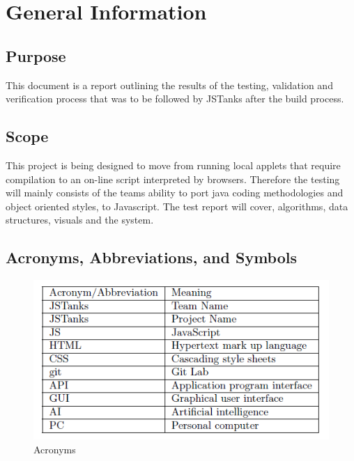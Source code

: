 \documentclass{article}
\begin{document}
\section{General Information}
\subsection{Purpose}
This document is a report outlining the results of the testing, validation and verification process 
that was to be followed by JSTanks after the build process. 

\subsection{Scope}
This project is being designed to move from running local applets that require 
compilation to an on-line script interpreted by browsers. Therefore the 
testing will mainly consists of the teams ability to port java coding 
methodologies and object oriented styles, to Javascript. The test report will 
cover, algorithms, data structures, visuals and the system. 

\subsection{Acronyms, Abbreviations, and Symbols}
\begin{figure}[H]
	\centering
	\includegraphics[width=\textwidth]{./Figures/fig1.png}
	\caption{Acronyms}
\end{figure}
\end{document}
